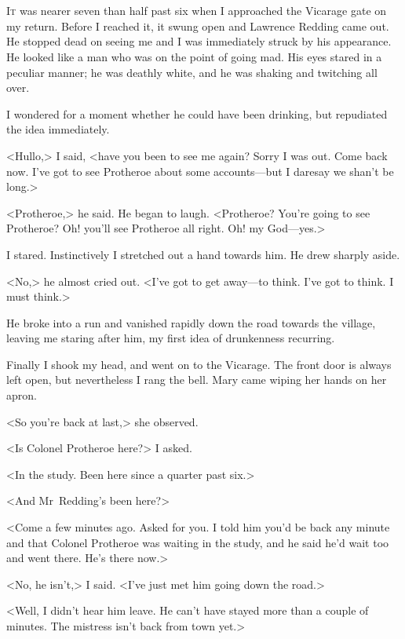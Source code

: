 \chapter[Chapter  \thechapter]{}


\lettrine{I}{t} was nearer seven than half past six when I approached the Vicarage gate on my return. Before I reached it, it swung open and Lawrence Redding came out. He stopped dead on seeing me and I was immediately struck by his appearance. He looked like a man who was on the point of going mad. His eyes stared in a peculiar manner; he was deathly white, and he was shaking and twitching all over.

I wondered for a moment whether he could have been drinking, but repudiated the idea immediately.

<Hullo,> I said, <have you been to see me again? Sorry I was out. Come back now. I've got to see Protheroe about some accounts—but I daresay we shan't be long.>

<Protheroe,> he said. He began to laugh. <Protheroe? You're going to see Protheroe? Oh! you'll see Protheroe all right. Oh! my God—yes.>

I stared. Instinctively I stretched out a hand towards him. He drew sharply aside.

<No,> he almost cried out. <I've got to get away—to think. I've got to think. I must think.>

He broke into a run and vanished rapidly down the road towards the village, leaving me staring after him, my first idea of drunkenness recurring.

Finally I shook my head, and went on to the Vicarage. The front door is always left open, but nevertheless I rang the bell. Mary came wiping her hands on her apron.

<So you're back at last,> she observed.

<Is Colonel Protheroe here?> I asked.

<In the study. Been here since a quarter past six.>

<And Mr~Redding's been here?>

<Come a few minutes ago. Asked for you. I told him you'd be back any minute and that Colonel Protheroe was waiting in the study, and he said he'd wait too and went there. He's there now.>

<No, he isn't,> I said. <I've just met him going down the road.>

<Well, I didn't hear him leave. He can't have stayed more than a couple of minutes. The mistress isn't back from town yet.>

